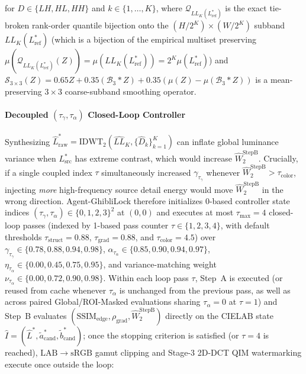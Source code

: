 \documentclass[conference,10pt]{IEEEtran}
\begin{document}
for $D \in \{LH, HL, HH\}$ and $k \in \{1, \dots, K\}$, where $\mathcal{Q}_{LL_K(L^*_{\text{ref}})}$ is the exact tie-broken rank-order quantile bijection onto the $(H/2^K)\times(W/2^K)$ subband $LL_K(L^*_{\text{ref}})$ (which is a bijection of the empirical multiset preserving $\mu(\mathcal{Q}_{LL_K(L^*_{\text{ref}})}(Z)) = \mu(LL_K(L^*_{\text{ref}})) = 2^K \mu(L^*_{\text{ref}})$) and $\mathcal{S}_{3\times 3}(Z) = 0.65 Z + 0.35 (\mathcal{B}_3 * Z) + 0.35(\mu(Z) - \mu(\mathcal{B}_3 * Z))$ is a mean-preserving $3\times 3$ coarse-subband smoothing operator.

\paragraph{Decoupled $(\tau_\gamma, \tau_\alpha)$ Closed-Loop Controller}
Synthesizing $\widehat{L}^*_{\text{raw}} = \mathrm{IDWT}_2(\widehat{LL}_K, \{\widehat{D}_k\}_{k=1}^K)$ can inflate global luminance variance when $L^*_{\text{src}}$ has extreme contrast, which would increase $\widehat{W}_2^{\text{StepB}}$. Crucially, if a single coupled index $\tau$ simultaneously increased $\gamma_{\tau_\gamma}$ whenever $\widehat{W}_2^{\text{StepB}} > \tau_{\text{color}}$, injecting \emph{more} high-frequency source detail energy would move $\widehat{W}_2^{\text{StepB}}$ in the wrong direction. Agent-GhibliLock therefore initializes 0-based controller state indices $(\tau_\gamma, \tau_\alpha) \in \{0, 1, 2, 3\}^2$ at $(0, 0)$ and executes at most $\tau_{\max} = 4$ closed-loop passes (indexed by 1-based pass counter $\tau \in \{1, 2, 3, 4\}$, with default thresholds $\tau_{\text{struct}} = 0.88$, $\tau_{\text{grad}} = 0.88$, and $\tau_{\text{color}} = 4.5$) over $\gamma_{\tau_\gamma} \in \{0.78, 0.88, 0.94, 0.98\}$, $\alpha_{\tau_\alpha} \in \{0.85, 0.90, 0.94, 0.97\}$, $\eta_{\tau_\alpha} \in \{0.00, 0.45, 0.75, 0.95\}$, and variance-matching weight $\nu_{\tau_\alpha} \in \{0.00, 0.72, 0.90, 0.98\}$. Within each loop pass $\tau$, Step~A is executed (or reused from cache whenever $\tau_\alpha$ is unchanged from the previous pass, as well as across paired Global/ROI-Masked evaluations sharing $\tau_\alpha = 0$ at $\tau = 1$) and Step~B evaluates $(\mathrm{SSIM}_{\text{edge}}, \rho_{\text{grad}}, \widehat{W}_2^{\text{StepB}})$ directly on the CIELAB state $\widehat{I} = (\widehat{L}^*, \widetilde{a}^*_{\text{cand}}, \widetilde{b}^*_{\text{cand}})$; once the stopping criterion is satisfied (or $\tau = 4$ is reached), $\mathrm{LAB}\to\mathrm{sRGB}$ gamut clipping and Stage-3 2D-DCT QIM watermarking execute once outside the loop:
\end{document}
